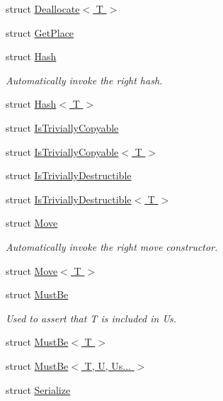 \begin{DoxyCompactItemize}
struct \hyperlink{structvt_1_1util_1_1adt_1_1detail_1_1_deallocate_3_01_t_01_4}{Deallocate$<$ T $>$}
\item 
struct \hyperlink{structvt_1_1util_1_1adt_1_1detail_1_1_get_place}{Get\+Place}
\item 
struct \hyperlink{structvt_1_1util_1_1adt_1_1detail_1_1_hash}{Hash}
\begin{DoxyCompactList}\small\item\em Automatically invoke the right hash. \end{DoxyCompactList}\item 
struct \hyperlink{structvt_1_1util_1_1adt_1_1detail_1_1_hash_3_01_t_01_4}{Hash$<$ T $>$}
\item 
struct \hyperlink{structvt_1_1util_1_1adt_1_1detail_1_1_is_trivially_copyable}{Is\+Trivially\+Copyable}
\item 
struct \hyperlink{structvt_1_1util_1_1adt_1_1detail_1_1_is_trivially_copyable_3_01_t_01_4}{Is\+Trivially\+Copyable$<$ T $>$}
\item 
struct \hyperlink{structvt_1_1util_1_1adt_1_1detail_1_1_is_trivially_destructible}{Is\+Trivially\+Destructible}
\item 
struct \hyperlink{structvt_1_1util_1_1adt_1_1detail_1_1_is_trivially_destructible_3_01_t_01_4}{Is\+Trivially\+Destructible$<$ T $>$}
\item 
struct \hyperlink{structvt_1_1util_1_1adt_1_1detail_1_1_move}{Move}
\begin{DoxyCompactList}\small\item\em Automatically invoke the right move constructor. \end{DoxyCompactList}\item 
struct \hyperlink{structvt_1_1util_1_1adt_1_1detail_1_1_move_3_01_t_01_4}{Move$<$ T $>$}
\item 
struct \hyperlink{structvt_1_1util_1_1adt_1_1detail_1_1_must_be}{Must\+Be}
\begin{DoxyCompactList}\small\item\em Used to assert that {\ttfamily T} is included in {\ttfamily Us}. \end{DoxyCompactList}\item 
struct \hyperlink{structvt_1_1util_1_1adt_1_1detail_1_1_must_be_3_01_t_01_4}{Must\+Be$<$ T $>$}
\item 
struct \hyperlink{structvt_1_1util_1_1adt_1_1detail_1_1_must_be_3_01_t_00_01_u_00_01_us_8_8_8_01_4}{Must\+Be$<$ T, U, Us... $>$}
\item 
struct \hyperlink{structvt_1_1util_1_1adt_1_1detail_1_1_serialize}{Serialize}

\end{DoxyCompactItemize}
